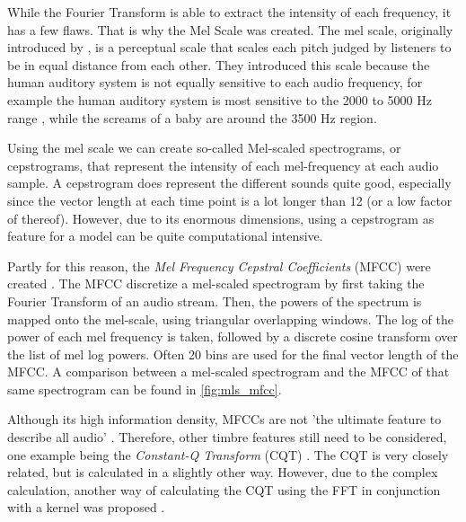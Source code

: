 While the Fourier Transform is able to extract the intensity of each frequency, it has a few flaws. That is why the Mel Scale was created. The mel scale, originally introduced by \textcite{Stevens1937scale}, is a perceptual scale that scales each pitch judged by listeners to be in equal distance from each other. They introduced this scale because the human auditory system is not equally sensitive to each audio frequency, for example the human auditory system is most sensitive to the 2000 to 5000 Hz range \cite{Gelfand1997essentials}, while the screams of a baby are around the 3500 Hz region. 

Using the mel scale we can create so-called Mel-scaled spectrograms, or cepstrograms, that represent the intensity of each mel-frequency at each audio sample. A cepstrogram does represent the different sounds quite good, especially since the vector length at each time point is a lot longer than 12 (or a low factor of thereof). However, due to its enormous dimensions, using a cepstrogram as feature for a model can be quite computational intensive.

Partly for this reason, the \textit{Mel Frequency Cepstral Coefficients} (MFCC) were created \cite{Logan2000mel}. The MFCC discretize a mel-scaled spectrogram by first taking the Fourier Transform of an audio stream. Then, the powers of the spectrum is mapped onto the mel-scale, using triangular overlapping windows. The log of the power of each mel frequency is taken, followed by a discrete cosine transform over the list of mel log powers. Often 20 bins are used for the final vector length of the MFCC. A comparison between a mel-scaled spectrogram and the MFCC of that same spectrogram can be found in \autoref{fig:mls_mfcc}.

Although its high information density, MFCCs are not 'the ultimate feature to describe all audio' \cite{Pachet2004improving}. Therefore, other timbre features still need to be considered, one example being the \textit{Constant-Q Transform} (CQT) \cite{Brown1991calculation}. The CQT is very closely related, but is calculated in a slightly other way. However, due to the complex calculation, another way of calculating the CQT using the FFT in conjunction with a kernel was proposed \cite{Brown1992efficient,Blankertz2001constant}.

